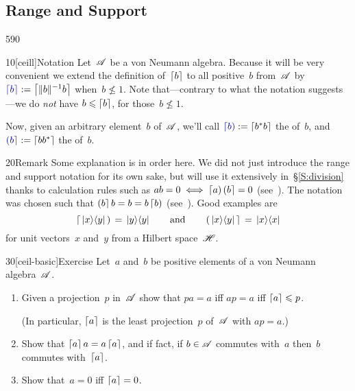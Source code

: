 \subsection{Range and Support}
\begin{parsec}{590}%
\begin{point}{10}[ceill]{Notation}%
Let~$\mathscr{A}$ be a von Neumann algebra.
Because it will be very convenient
we extend the definition of~$\left\lceil b\right\rceil$
to all positive~$b$ from~$\mathscr{A}$
by 
$\Define{\ceil{b}}:=\ceil{\|b\|^{-1} b}$%
%
when~$b\nleq 1$.
    Note that---contrary to what the notation suggests---we
    do \emph{not} have  $b\leqslant \left\lceil b\right\rceil$, 
    for those~$b\nleq 1$.

Now, given an arbitrary element~$b$ of~$\mathscr{A}$,
we'll call $\Define{\ceill{b}}:=\ceil{b^*b}$
the  of~$b$,%
	and~$\Define{\ceilr{b}}:=\ceil{bb^*}$%
the  of~$b$.
\end{point}
\begin{point}{20}{Remark}%
Some explanation is in order here.
We did not just introduce
the range
and support notation for its own sake,
but will use it extensively in~\S\ref{S:division}
thanks to calculation  rules
such as $ab=0\iff \left\lceil a\right)\left(b\right\rceil=0$
(see~).
The notation was chosen such 
that $\left(b\right\rceil b=b= b\left\lceil b\right)$
(see~).
Good examples are 
\begin{equation*}
	\left\lceil\,\left|x\right>\!\left<y\right|\,\right)
\,= \,\left|y\right>\!\left<y\right|
\qquad\text{and}\qquad
\left(\,\left|x\right>\!\left<y\right|\,\right\rceil
\,=\, \left|x\right>\!\left<x\right|
\end{equation*}
for unit vectors~$x$ and~$y$ from a Hilbert space~$\mathscr{H}$.
\end{point}
\begin{point}{30}[ceil-basic]{Exercise}%
Let~$a$ and~$b$ be positive elements of a von Neumann algebra~$\mathscr{A}$.
\begin{enumerate}
\item
Given a projection~$p$ in~$\mathscr{A}$
show that $pa=a$ iff $ap=a$ iff $\left\lceil a\right\rceil\leqslant p$.

(In particular, $\left\lceil a\right\rceil$ is the least projection~$p$ of~$\mathscr{A}$
with $a p=a$.)

\item
Show that $\left\lceil a\right\rceil a=a\left\lceil a\right\rceil$,
and if fact, if $b\in\mathscr{A}$ commutes with~$a$
then~$b$ commutes with~$\left\lceil a\right\rceil$.

\item
Show that~$a=0$ iff $\left\lceil a\right\rceil=0$.


\end{enumerate}
\end{point}
\end{parsec}
